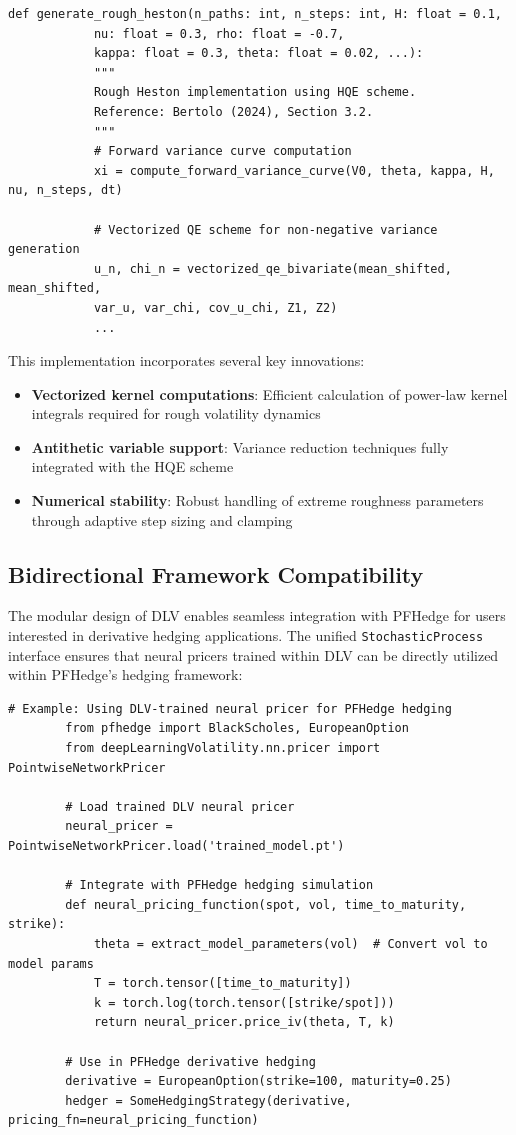 	\begin{lstlisting}[style=cleanpy]
		def generate_rough_heston(n_paths: int, n_steps: int, H: float = 0.1, 
			nu: float = 0.3, rho: float = -0.7, 
			kappa: float = 0.3, theta: float = 0.02, ...):
			"""
			Rough Heston implementation using HQE scheme.
			Reference: Bertolo (2024), Section 3.2.
			"""
			# Forward variance curve computation
			xi = compute_forward_variance_curve(V0, theta, kappa, H, nu, n_steps, dt)
			
			# Vectorized QE scheme for non-negative variance generation
			u_n, chi_n = vectorized_qe_bivariate(mean_shifted, mean_shifted, 
			var_u, var_chi, cov_u_chi, Z1, Z2)
			...
	\end{lstlisting}
	
	This implementation incorporates several key innovations:
	
	\begin{itemize}[nosep]
		\item \textbf{Vectorized kernel computations}: Efficient calculation of power-law kernel integrals required for rough volatility dynamics
		\item \textbf{Antithetic variable support}: Variance reduction techniques fully integrated with the HQE scheme
		\item \textbf{Numerical stability}: Robust handling of extreme roughness parameters through adaptive step sizing and clamping
	\end{itemize}
	
	\subsection{Bidirectional Framework Compatibility}
	
	The modular design of DLV enables seamless integration with PFHedge for users interested in derivative hedging applications. The unified \texttt{StochasticProcess} interface ensures that neural pricers trained within DLV can be directly utilized within PFHedge's hedging framework:
	
	\begin{lstlisting}[style=cleanpy]
		# Example: Using DLV-trained neural pricer for PFHedge hedging
		from pfhedge import BlackScholes, EuropeanOption
		from deepLearningVolatility.nn.pricer import PointwiseNetworkPricer
		
		# Load trained DLV neural pricer
		neural_pricer = PointwiseNetworkPricer.load('trained_model.pt')
		
		# Integrate with PFHedge hedging simulation
		def neural_pricing_function(spot, vol, time_to_maturity, strike):
			theta = extract_model_parameters(vol)  # Convert vol to model params
			T = torch.tensor([time_to_maturity])
			k = torch.log(torch.tensor([strike/spot]))
			return neural_pricer.price_iv(theta, T, k)
		
		# Use in PFHedge derivative hedging
		derivative = EuropeanOption(strike=100, maturity=0.25)
		hedger = SomeHedgingStrategy(derivative, pricing_fn=neural_pricing_function)
	\end{lstlisting}
	
